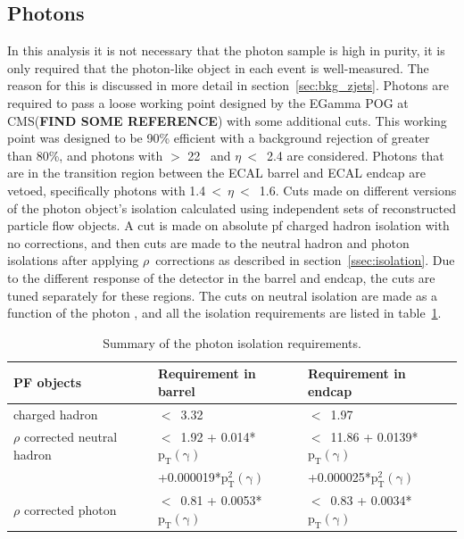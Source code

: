 \subsection{Photons}
\label{ssec:phosel}
In this analysis it is not necessary that the photon sample is high in purity,
it is only required that the photon-like object in each event is well-measured.
The reason for this is discussed in more detail in section~\ref{sec:bkg_zjets}.
Photons are required to pass a loose working point designed by the EGamma POG at CMS({\bf FIND SOME REFERENCE}) with some additional cuts.
This working point was designed to be 90\% efficient with a background rejection of greater than 80\%,
and photons with \pt $>$ 22 \gev\ and $\eta~<$~2.4 are considered.
Photons that are in the transition region between the ECAL barrel and ECAL endcap are vetoed,
specifically photons with 1.4$~<~\eta~<$~1.6.
Cuts made on different versions of the photon object's isolation calculated using independent sets of reconstructed particle flow objects.
A cut is made on absolute pf charged hadron isolation with no corrections,
and then cuts are made to the neutral hadron and photon isolations after applying $\rho$~corrections as described in section~\ref{ssec:isolation}.
Due to the different response of the detector in the barrel and endcap, the cuts are tuned separately for these regions.
The cuts on neutral isolation are made as a function of the photon \pt, and all the isolation requirements are listed in table~\ref{tab:photons}.


\begin{table}[htb]
  \begin{center}
    \caption{
      \label{tab:photons}
      Summary of the photon isolation requirements.
    }
    \begin{tabular}{l|l|l}
      \hline
      \hline
      PF objects                      &Requirement in barrel                    &Requirement in endcap \\
      \hline
      charged hadron                  &$<$~3.32                                 &$<$~1.97                                    \\
      $\rho$ corrected neutral hadron &$<$~1.92 + 0.014*$\mathrm{p_{T}(\gamma)}$ &$<$~11.86 + 0.0139*$\mathrm{p_{T}(\gamma)}$ \\
                                      &+0.000019*$\mathrm{p_{T}^{2}(\gamma)}$     &+0.000025*$\mathrm{p_{T}^{2}(\gamma)}$       \\
      $\rho$ corrected photon         &$<$~0.81 + 0.0053*$\mathrm{p_{T}(\gamma)}$&$<$~0.83 + 0.0034*$\mathrm{p_{T}(\gamma)}$  \\
      \hline
      \hline      
    \end{tabular}
  \end{center}
\end{table}

